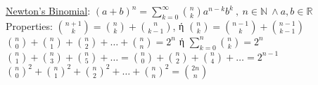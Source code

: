 \documentclass[12pt]{article}
\begin{document}
\begin{flushleft}
	\textbullet \quad \uline{Newton's Binomial}: \linebreak 
	$(a+b)^n = \sum \limits_{k=0}^{\infty} \binom{n}{k} a^{n-k} b^k \ , \ n\in \mathbb{N} \ \land a,b \in \mathbb{R}$ \linebreak 
	Properties: \linebreak 
	\textbullet \quad $\displaystyle \binom{n+1}{k} = \binom{n}{k} + \binom{n}{k-1} $, \textgreek{ή} $\binom{n}{k} = \binom{n-1}{k} + \binom{n-1}{k-1} $ \linebreak 
	\textbullet \quad $\displaystyle \binom{n}{0} + \binom{n}{1} + \binom{n}{2} + \ldots + \binom{n}{n} = 2^n $ \textgreek{ή} $ \sum \limits_{k=0}^{n} \binom{n}{k} = 2^n $ \linebreak 
	\textbullet \quad $\displaystyle \binom{n}{1} + \binom{n}{3} + \binom{n}{5} + \ldots = \binom{n}{0} + \binom{n}{2} + \binom{n}{4} + \ldots = 2^{n-1} $ \linebreak 
	\textbullet \quad $\displaystyle \binom{n}{0} ^2 + \binom{n}{1} ^2 + \binom{n}{2} ^2 + \ldots + \binom{n}{n} ^2 = \binom{2n}{n} $ \linebreak 
	

\end{flushleft}
\end{document}
